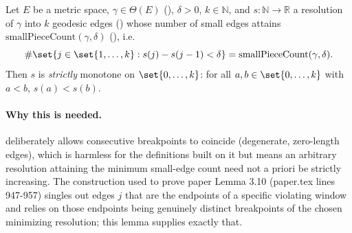 \begin{lemma}
  Let $E$ be a metric space, $\gamma \in \Theta(E)$ (), $\delta > 0$, $k \in
  \mathbb{N}$, and $s \colon \mathbb{N} \to \mathbb{R}$ a resolution of $\gamma$ into $k$ geodesic
  edges () whose number of small edges attains
  $\mathrm{smallPieceCount}(\gamma,\delta)$ (), i.e.
  \[
    \#\set{j \in \set{1,\dots,k} : s(j)-s(j-1) < \delta} = \mathrm{smallPieceCount}(\gamma,\delta)
    .
  \]
  Then $s$ is \emph{strictly} monotone on $\set{0,\dots,k}$: for all $a,b \in \set{0,\dots,k}$
  with $a<b$, $s(a) < s(b)$.

  \paragraph{Why this is needed.}  deliberately allows consecutive
  breakpoints to coincide (degenerate, zero-length edges), which is harmless for the definitions
  built on it but means an arbitrary resolution attaining the minimum small-edge count need not
  a priori be strictly increasing. The construction used to prove paper Lemma 3.10 (paper.tex
  lines 947-957) singles out edges $j$ that are the endpoints of a specific violating window and
  relies on those endpoints being genuinely distinct breakpoints of the chosen minimizing
  resolution; this lemma supplies exactly that.
\end{lemma}
